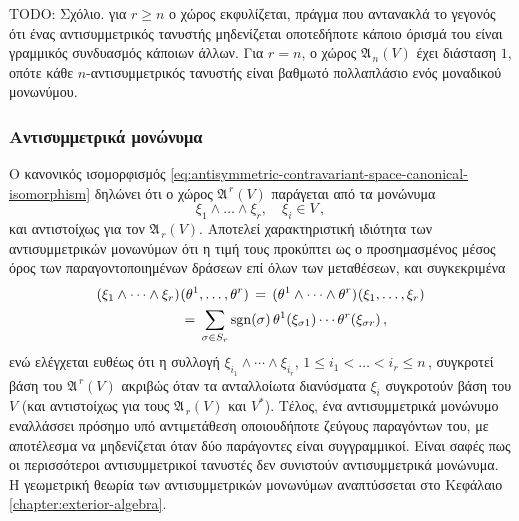 \documentclass[11pt,a4paper,twoside,openright]{book}
\begin{document}
TODO: Σχόλιο. για $r \ge n$ ο χώρος εκφυλίζεται, πράγμα που αντανακλά το γεγονός ότι ένας αντισυμμετρικός τανυστής μηδενίζεται οποτεδήποτε κάποιο όρισμά του είναι γραμμικός συνδυασμός κάποιων άλλων. Για $r = n$, ο χώρος $\mathfrak{A}_{\,n}(V)$ έχει διάσταση $1$, οπότε κάθε $n$-αντισυμμετρικός τανυστής είναι βαθμωτό πολλαπλάσιο ενός μοναδικού μονωνύμου.

\subsubsection{Αντισυμμετρικά μονώνυμα}
	\label{sec:antisymmetric-mononyms}

Ο κανονικός ισομορφισμός \eqref{eq:antisymmetric-contravariant-space-canonical-isomorphism} δηλώνει ότι
ο χώρος $\mathfrak{A}^{\,r}(V)$ παράγεται από τα μονώνυμα
\begin{equation*}
\xi_1 \wedge \dots \wedge \xi_r,
\quad
\xi_i \in V\,,
\end{equation*}
και αντιστοίχως για τον $\mathfrak{A}_{\,r}(V)$. Αποτελεί χαρακτηριστική ιδιότητα των αντισυμμετρικών μονωνύμων ότι η τιμή τους προκύπτει ως ο προσημασμένος μέσος όρος των παραγοντοποιημένων δράσεων επί όλων των μεταθέσεων, και συγκεκριμένα
\begin{equation}\label{eq:antisymmetric-mononyms-property}
\begin{split}
(\xi_1 \wedge \dots \wedge \xi_r)\hspace{.5pt}(\theta^1, \dots, \theta^r)
\,&=\,
(\theta^1 \wedge \dots \wedge \theta^r)\hspace{.5pt}(\xi_1, \dots, \xi_r)\\
\,=\,
\sum_{\sigma \in S_r}
\operatorname{sgn}&(\sigma)
\,
\theta^1(\xi_{\sigma 1}) \cdots \theta^r(\xi_{\sigma r})\,,
\end{split}
\end{equation}
ενώ ελέγχεται ευθέως ότι η συλλογή
$\xi_{i_1} \wedge \cdots \wedge \xi_{i_r}$,
$1 \le i_1 < \dots < i_r \le n\,$,
συγκροτεί βάση του $\mathfrak{A}^{\,r}(V)$
ακριβώς όταν τα ανταλλοίωτα διανύσματα $\xi_i$
συγκροτούν βάση του $V$ (και αντιστοίχως για τους $\mathfrak{A}_{\,r}(V)$ και $V^*$).
Τέλος, ένα αντισυμμετρικά μονώνυμο εναλλάσσει πρόσημο υπό αντιμετάθεση οποιουδήποτε ζεύγους παραγόντων του, με αποτέλεσμα να μηδενίζεται όταν δύο παράγοντες είναι συγγραμμικοί.
Είναι σαφές πως οι περισσότεροι αντισυμμετρικοί τανυστές δεν συνιστούν αντισυμμετρικά μονώνυμα.
Η γεωμετρική θεωρία των αντισυμμετρικών μονωνύμων αναπτύσσεται στο Kεφάλαιο \ref{chapter:exterior-algebra}.
\end{document}
